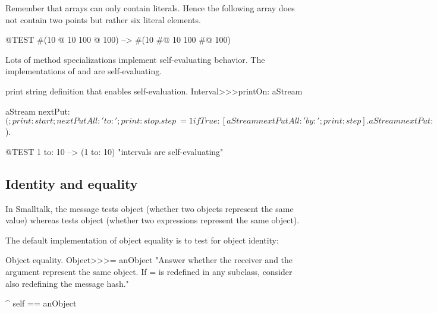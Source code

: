 \documentclass[a4paper,10pt,twoside]{book}
\begin{document}
Remember that  arrays can only contain literals.
Hence the following array does not contain two points but rather six literal elements.
\begin{code}{@TEST}
#(10 @ 10 100 @ 100) --> #(10 #@ 10 100 #@ 100)
\end{code}

Lots of  method specializations implement self-evaluating behavior.
The implementations of  and  are self-evaluating.


\begin{method}{ print string definition that enables self-evaluation.}
Interval>>>printOn: aStream

    aStream nextPut: $(;
        print: start;
        nextPutAll: ' to: ';
        print: stop.
    step ~= 1 ifTrue: [aStream nextPutAll: ' by: '; print: step].
    aStream nextPut: $).
\end{method}

\begin{code}{@TEST}
1 to: 10 --> (1 to: 10)    "intervals are self-evaluating"
\end{code}

\subsection{Identity and equality}

In Smalltalk, the message \ct{=} tests object  (\ie whether two objects represent the same value) whereas \ct{==} tests object  (\ie whether two expressions represent the same object).

The default implementation of object equality is to test for object identity:
\begin{method}{Object equality.}
Object>>>= anObject
    "Answer whether the receiver and the argument represent the same object.
    If = is redefined in any subclass, consider also redefining the message hash."

    ^ self == anObject
\end{method}
\end{document}
